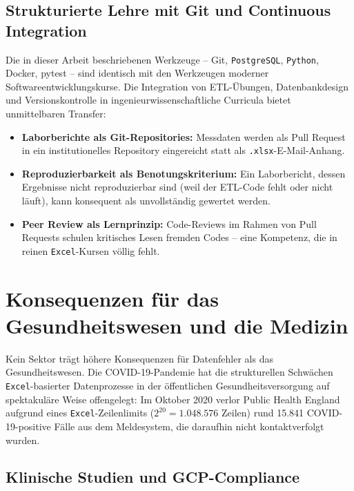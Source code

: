 \documentclass[12pt,a4paper]{report}
\theoremstyle{definition}
\theoremstyle{remark}
\newcommand{\excel}{\texttt{Excel}}
\newcommand{\pg}{\texttt{PostgreSQL}}
\newcommand{\py}{\texttt{Python}}
\newcommand{\code}[1]{\texttt{#1}}
\begin{document}
\subsection{Strukturierte Lehre mit Git und Continuous Integration}

Die in dieser Arbeit beschriebenen Werkzeuge -- Git, \pg{}, \py{},
Docker, pytest -- sind identisch mit den Werkzeugen moderner
Softwareentwicklungskurse.
Die Integration von ETL-Übungen, Datenbankdesign und Versionskontrolle
in ingenieurwissenschaftliche Curricula bietet unmittelbaren Transfer:
\begin{itemize}[leftmargin=1.5em, itemsep=2pt]
  \item \textbf{Laborberichte als Git-Repositories:} Messdaten werden
        als Pull Request in ein institutionelles Repository eingereicht
        statt als \code{.xlsx}-E-Mail-Anhang.
  \item \textbf{Reproduzierbarkeit als Benotungskriterium:}
        Ein Laborbericht, dessen Ergebnisse nicht reproduzierbar sind
        (weil der ETL-Code fehlt oder nicht läuft), kann konsequent
        als unvollständig gewertet werden.
  \item \textbf{Peer Review als Lernprinzip:}
        Code-Reviews im Rahmen von Pull Requests schulen kritisches
        Lesen fremden Codes -- eine Kompetenz, die in reinen
        \excel-Kursen völlig fehlt.
\end{itemize}

\section{Konsequenzen für das Gesundheitswesen und die Medizin}

Kein Sektor trägt höhere Konsequenzen für Datenfehler als das
Gesundheitswesen. Die COVID-19-Pandemie hat die strukturellen Schwächen
\excel-basierter Datenprozesse in der öffentlichen Gesundheitsversorgung
auf spektakuläre Weise offengelegt:
Im Oktober 2020 verlor Public Health England aufgrund eines
\excel-Zeilenlimits ($2^{20} = 1{.}048{.}576$ Zeilen) rund 15.841
COVID-19-positive Fälle aus dem Meldesystem, die daraufhin nicht
kontaktverfolgt wurden.

\subsection{Klinische Studien und GCP-Compliance}
\end{document}
